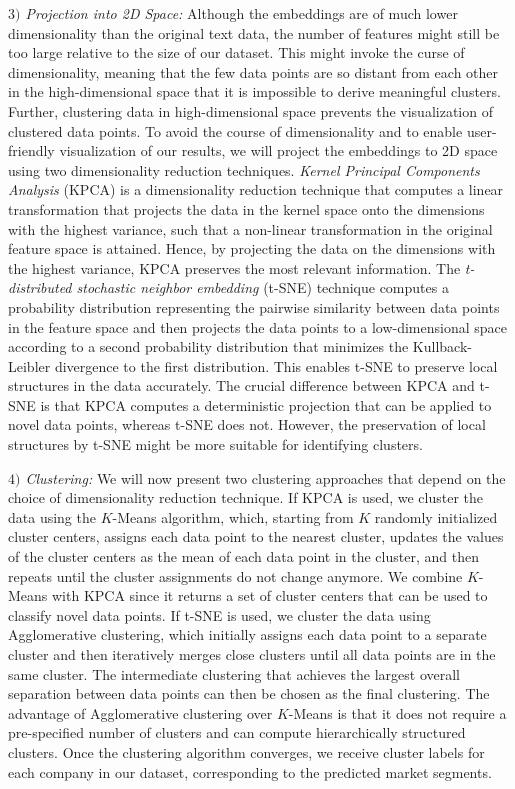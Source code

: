 \documentclass[conference]{IEEEtran}
\begin{document}
\textit{$3)$ Projection into 2D Space:} Although the embeddings are of much lower dimensionality than the original text data, the number of features might still be too large relative to the size of our dataset. This might invoke the curse of dimensionality, meaning that the few data points are so distant from each other in the high-dimensional space that it is impossible to derive meaningful clusters. Further, clustering data in high-dimensional space prevents the visualization of clustered data points. To avoid the course of dimensionality and to enable user-friendly visualization of our results, we will project the embeddings to 2D space using two dimensionality reduction techniques.
\emph{Kernel Principal Components Analysis} (KPCA) is a dimensionality reduction technique that computes a linear transformation that projects the data in the kernel space onto the dimensions with the highest variance, such that a non-linear transformation in the original feature space is attained. Hence, by projecting the data on the dimensions with the highest variance, KPCA preserves the most relevant information.
The \emph{t-distributed stochastic neighbor embedding} (t-SNE) technique computes a probability distribution representing the pairwise similarity between data points in the feature space and then projects the data points to a low-dimensional space according to a second probability distribution that minimizes the Kullback-Leibler divergence to the first distribution. This enables t-SNE to preserve local structures in the data accurately.
The crucial difference between KPCA and t-SNE is that KPCA computes a deterministic projection that can be applied to novel data points, whereas t-SNE does not. However, the preservation of local structures by t-SNE might be more suitable for identifying clusters.

\textit{$4)$ Clustering:} We will now present two clustering approaches that depend on the choice of dimensionality reduction technique.
If KPCA is used, we cluster the data using the $K$-Means algorithm, which, starting from $K$ randomly initialized cluster centers, assigns each data point to the nearest cluster, updates the values of the cluster centers as the mean of each data point in the cluster, and then repeats until the cluster assignments do not change anymore. We combine $K$-Means with KPCA since it returns a set of cluster centers that can be used to classify novel data points. 
If t-SNE is used, we cluster the data using Agglomerative clustering, which initially assigns each data point to a separate cluster and then iteratively merges close clusters until all data points are in the same cluster. The intermediate clustering that achieves the largest overall separation between data points can then be chosen as the final clustering. The advantage of Agglomerative clustering over $K$-Means is that it does not require a pre-specified number of clusters and can compute hierarchically structured clusters.
Once the clustering algorithm converges, we receive cluster labels for each company in our dataset, corresponding to the predicted market segments.
\end{document}
